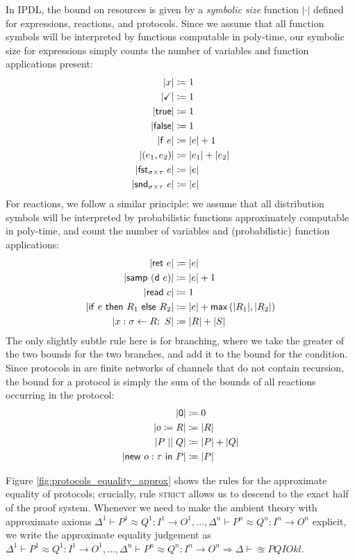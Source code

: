 In \textsf{IPDL}, the bound on resources is given by a \emph{symbolic size} function $|\cdot|$ defined for expressions, reactions, and protocols. Since we assume that all function symbols will be interpreted by  functions computable in poly-time, our symbolic size for expressions simply counts the number of variables and function applications present:
\begin{align*}
|x| & \coloneqq 1 \\
|\checkmark| & \coloneqq 1 \\
|\mathsf{true}| & \coloneqq 1 \\
|\mathsf{false}| & \coloneqq 1 \\
|\mathsf{f} \ e| & \coloneqq |e| + 1 \\
|(e_1, e_2)| & \coloneqq |e_1| + |e_2| \\
|\mathsf{fst}_{\sigma \times \tau} \ e| & \coloneqq |e| \\
|\mathsf{snd}_{\sigma \times \tau} \ e| & \coloneqq |e|
\end{align*}
For reactions, we follow a similar principle: we assume that all distribution symbols will be interpreted by probabilistic functions approximately computable in poly-time, and count the number of variables and (probabilistic) function applications:
\begin{align*}
|\mathsf{ret} \ e| & \coloneqq |e| \\
|\mathsf{samp} \ (\mathsf{d} \ e)| & \coloneqq |e| + 1 \\
|\mathsf{read} \ c| & \coloneqq 1 \\
|\mathsf{if} \ e \ \mathsf{then} \ R_1 \ \mathsf{else} \ R_2| & \coloneqq |e| + \mathsf{max} \, (|R_1|, |R_2|) \\
|x : \sigma \leftarrow R; \ S| & \coloneqq |R| + |S|
\end{align*}
The only slightly subtle rule here is for branching, where we take the greater of the two bounds for the two branches, and add it to the bound for the condition.
Since protocols in \ipdl are finite networks of channels that do not contain recursion, the bound for a protocol is simply the sum of the bounds of all reactions occurring in the protocol:
\begin{align*}
|\mathsf{0}| & \coloneqq 0 \\
|o \coloneqq R| & \coloneqq |R| \\
|P \; || \; Q| & \coloneqq |P| + |Q| \\
|\mathsf{new} \ o : \tau \ \mathsf{in} \ P| & \coloneqq |P|
\end{align*}

Figure \ref{fig:protocols_equality_approx} shows the rules for the approximate equality of \ipdl protocols; crucially, rule \textsc{strict} allows us to descend to the exact half of the proof system. Whenever we need to make the ambient theory with approximate axioms $\Delta^1 \vdash P^1 \approx Q^1 : I^1 \to O^1, \ldots, \Delta^n \vdash P^n \approx Q^n : I^n \to O^n$ explicit, we write the approximate equality judgement as $\Delta^1 \vdash P^1 \approx Q^1 : I^1 \to O^1, \ldots, \Delta^n \vdash P^n \approx Q^n : I^n \to O^n \Rightarrow \Delta \vdash \approxeq{P}{Q}{I}{O}{k}{l}$.

